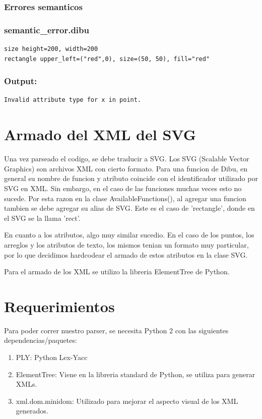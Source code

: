 \documentclass{article}
\theoremstyle{definition}
\theoremstyle{remark}
\begin{document}
\subsubsection{Errores semanticos}

\subsubsection*{semantic\_error.dibu}
\begin{verbatim}
size height=200, width=200
rectangle upper_left=("red",0), size=(50, 50), fill="red"
\end{verbatim}

\subsubsection*{Output:}
\begin{verbatim}
Invalid attribute type for x in point.
\end{verbatim}


\section{Armado del XML del SVG}

Una vez parseado el codigo, se debe traducir a SVG. Los SVG (Scalable Vector Graphics) son archivos XML con cierto formato. Para una funcion de Dibu, en general su nombre de funcion y atributo coincide con el identificador utilizado por SVG en XML. Sin embargo, en el caso de las funciones muchas veces esto no sucede. Por esta razon en la clase AvailableFunctions(), al agregar una funcion tambien se debe agregar su alias de SVG. Este es el caso de 'rectangle', donde en el SVG se la llama 'rect'.

En cuanto a los atributos, algo muy similar sucedio. En el caso de los puntos, los arreglos y los atributos de texto, los mismos tenian un formato muy particular, por lo que decidimos hardcodear el armado de estos atributos en la clase SVG.

Para el armado de los XML se utilizo la libreria ElementTree de Python.

\section{Requerimientos}

Para poder correr nuestro parser, se necesita Python 2 con las siguientes dependencias/paquetes:

\begin{enumerate}
	\item PLY: Python Lex-Yacc
	\item ElementTree: Viene en la libreria standard de Python, se utiliza para generar XMLs.
	\item xml.dom.minidom: Utilizado para mejorar el aspecto visual de los XML generados.
\end{enumerate}
\end{document}

